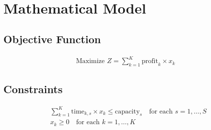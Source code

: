 \documentclass{article}
\begin{document}
\section*{Mathematical Model}

\subsection*{Objective Function}
\begin{align*}
\text{Maximize } Z = \sum_{k=1}^{K} \text{profit}_{k} \times x_k
\end{align*}

\subsection*{Constraints}
\begin{align*}
& \sum_{k=1}^{K} \text{time}_{k, s} \times x_k \leq \text{capacity}_{s} \quad \text{for each } s = 1, \ldots, S \\
& x_k \geq 0 \quad \text{for each } k = 1, \ldots, K
\end{align*}
\end{document}

